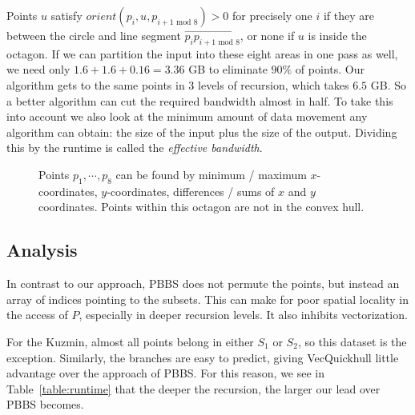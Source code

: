 Points $u$ satisfy $orient(p_i, u, p_{i + 1 \text{ mod } 8}) > 0$ for precisely 
one $i$ if they are between the circle and line segment 
$\overrightarrow{p_i p_{i + 1 \text{ mod } 8}}$, or none if 
$u$ is inside the octagon.
If we can partition the input into these eight areas
in one pass as well, we need only $1.6 + 1.6 + 0.16 = 3.36$ GB to eliminate
$90\%$ of points. Our algorithm gets to the same points in $3$ levels of
recursion, which takes $6.5$ GB. So a better algorithm can cut the required
bandwidth almost in half. To take this into account we also look at the minimum
amount of data movement any algorithm can obtain: the size of the input plus
the size of the output. Dividing this by the runtime is called the
\textit{effective bandwidth}.

\begin{figure}[ht]
    \caption{Points $p_1, \cdots, p_8$ can be found by minimum / maximum
             $x$-coordinates, $y$-coordinates, differences / sums of 
             $x$ and $y$ coordinates. Points within this octagon are not in 
             the convex hull.}
    \label{fig:akl}
\end{figure}

\subsection{Analysis}

In contrast to our approach, PBBS does not permute the points, but instead
an array of indices pointing to the subsets. This can make for poor spatial
locality in the access of $P$, especially in deeper recursion levels.
It also inhibits vectorization.

For the Kuzmin, almost all points belong in either $S_1$ or $S_2$, so
this dataset is the exception. Similarly, the branches are easy to predict,
giving VecQuickhull little advantage over the approach of
PBBS. For this reason, we see in Table~\ref{table:runtime} that the deeper
the recursion, the larger our lead over PBBS becomes. 

